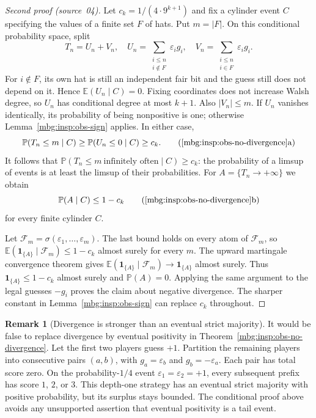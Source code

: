 \documentclass[11pt,letterpaper]{article}
\theoremstyle{definition}
\newtheorem{remark}[theorem]{Remark}
\newcommand{\E}{\mathbb E}
\newcommand{\Prb}{\mathbb P}
\newcommand{\indic}[1]{\mathbf 1_{\{#1\}}}
\begin{document}
\begin{proof}[Second proof (source~04)]
Let $c_k=1/(4\cdot9^{k+1})$ and fix a cylinder event $C$ specifying
the values of a finite set $F$ of hats.  Put $m=|F|$.  On this
conditional probability space, split
\[
 T_n=U_n+V_n,
 \quad U_n=\sum_{\substack{i\le n\\i\notin F}}\varepsilon_i g_i,
 \quad V_n=\sum_{\substack{i\le n\\i\in F}}\varepsilon_i g_i.
\]
For $i\notin F$, its own hat is still an independent fair bit and the
guess still does not depend on it.  Hence $\E(U_n\mid C)=0$.
Fixing coordinates does not increase Walsh degree, so $U_n$ has
conditional degree at most $k+1$.  Also $|V_n|\le m$.
If $U_n$ vanishes identically, its probability of being nonpositive is
one; otherwise Lemma~\ref{mbg:insp:obs-sign} applies.  In either case,
\[
 \Prb(T_n\le m\mid C)
 \ge\Prb(U_n\le0\mid C)\ge c_k.
 \tag{\ref{mbg:insp:obs-no-divergence}a}
\]
It follows that
$\Prb(T_n\le m\ \text{infinitely often}\mid C)\ge c_k$:
the probability of a limsup of events is at least the limsup of their
probabilities.  For $A=\{T_n\to+\infty\}$ we obtain
\[
 \Prb(A\mid C)\le1-c_k
 \tag{\ref{mbg:insp:obs-no-divergence}b}
\]
for every finite cylinder $C$.

Let $\mathcal F_m=\sigma(\varepsilon_1,\ldots,\varepsilon_m)$.
The last bound holds on every atom of $\mathcal F_m$, so
$\E(\indic{A}\mid\mathcal F_m)\le1-c_k$ almost surely for every $m$.
The upward martingale convergence theorem gives
$\E(\indic{A}\mid\mathcal F_m)\to\indic{A}$ almost surely.
Thus $\indic{A}\le1-c_k$ almost surely and $\Prb(A)=0$.
Applying the same argument to the legal guesses $-g_i$ proves the
claim about negative divergence.  The sharper constant in
Lemma~\ref{mbg:insp:obs-sign} can replace $c_k$ throughout.
\end{proof}

\begin{remark}[Divergence is stronger than an eventual strict majority]
\label{mbg:insp:obs-eventual-majority}
It would be false to replace divergence by eventual positivity in
Theorem~\ref{mbg:insp:obs-no-divergence}.  Let the first two players guess $+1$.
Partition the remaining players into consecutive pairs $(a,b)$, with
$g_a=\varepsilon_b$ and $g_b=-\varepsilon_a$.  Each pair has total
score zero.  On the probability-$1/4$ event
$\varepsilon_1=\varepsilon_2=+1$, every subsequent prefix has score
$1$, $2$, or $3$.  This depth-one strategy has an eventual strict
majority with positive probability, but its surplus stays bounded.
The conditional proof above avoids any unsupported assertion that
eventual positivity is a tail event.
\end{remark}
\end{document}
